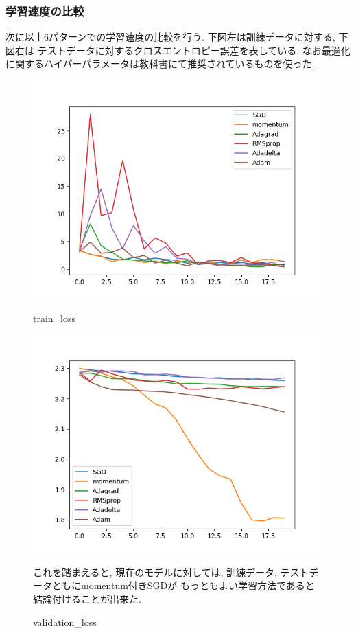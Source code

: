 \documentclass[a4paper,11pt]{jsarticle}
\begin{document}
\subsubsection*{学習速度の比較}
次に以上6パターンでの学習速度の比較を行う.
下図左は訓練データに対する, 下図右は
テストデータに対するクロスエントロピー誤差を表している.
なお最適化に関するハイパーパラメータは教科書にて推奨されているものを使った.
\begin{figure}[H]
  \begin{minipage}[b]{0.45\linewidth}
    \centering
    \includegraphics*[keepaspectratio, width=0.9\linewidth]{loss_history.png}
    \caption{train\_loss}
  \end{minipage}
  \begin{minipage}[b]{0.45\linewidth}
    \centering
    \includegraphics*[keepaspectratio, width=0.9\linewidth]{val_loss_history.png}
    \caption{validation\_loss}
  \end{minipage}

  これを踏まえると, 現在のモデルに対しては, 訓練データ, テストデータともにmomentum付きSGDが
  もっともよい学習方法であると結論付けることが出来た.

\end{figure}
\end{document}
